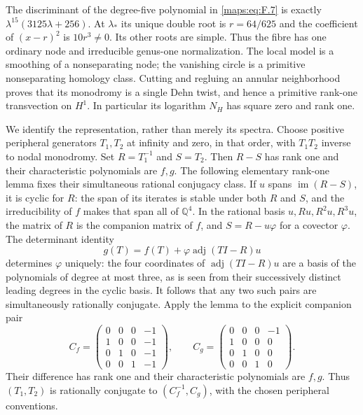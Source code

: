 \item The discriminant of the degree-five polynomial in \eqref{maps:eq:F.7} is exactly
$\lambda^{15}(3125\lambda+256)$.  At $\lambda_*$ its unique double
root is $r=64/625$ and the coefficient of $(x-r)^2$ is
$10r^3\ne0$.  Its other roots are simple.  Thus the fibre has one
ordinary node and irreducible genus-one normalization.  The local
model is a smoothing of a nonseparating node; the vanishing circle
is a primitive nonseparating homology class.  Cutting and regluing
an annular neighborhood proves that its monodromy is a single
Dehn twist, and hence a primitive rank-one transvection on $H^1$.
In particular its logarithm $N_H$ has square zero and rank one.


\item We identify the representation, rather than merely its spectra.
Choose positive peripheral generators $T_1,T_2$ at infinity and
zero, in that order, with $T_1T_2$ inverse to nodal monodromy.
Set $R=T_1^{-1}$ and $S=T_2$.  Then $R-S$ has rank one and their
characteristic polynomials are $f,g$.  The following elementary
rank-one lemma fixes their simultaneous rational conjugacy class.
If $u$ spans $\operatorname{im}(R-S)$, it is cyclic for $R$:
the span of its iterates is stable under both $R$ and $S$, and
the irreducibility of $f$ makes that span all of $\mathbb Q^4$.
In the rational basis $u,Ru,R^2u,R^3u$, the matrix of $R$ is
the companion matrix of $f$, and $S=R-u\varphi$ for a covector
$\varphi$.  The determinant identity
\[
 g(T)=f(T)+\varphi\operatorname{adj}(TI-R)u
 \tag{F.9}\label{maps:eq:F.9}
\]
determines $\varphi$ uniquely: the four coordinates of
$\operatorname{adj}(TI-R)u$ are a basis of the polynomials of
degree at most three, as is seen from their successively distinct
leading degrees in the cyclic basis.  It follows that any two
such pairs are simultaneously rationally conjugate.  Apply the
lemma to the explicit companion pair
\[
 C_f=\begin{pmatrix}
 0&0&0&-1\\1&0&0&-1\\0&1&0&-1\\0&0&1&-1
 \end{pmatrix},\qquad
 C_g=\begin{pmatrix}
 0&0&0&-1\\1&0&0&0\\0&1&0&0\\0&0&1&0
 \end{pmatrix}.
 \tag{F.10}\label{maps:eq:F.10}
\]
Their difference has rank one and their characteristic polynomials
are $f,g$.  Thus $(T_1,T_2)$ is rationally conjugate to
$(C_f^{-1},C_g)$, with the chosen peripheral conventions.


